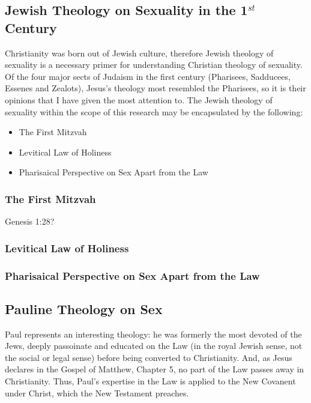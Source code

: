 \documentclass{article}
\begin{document}
\subsection{Jewish Theology on Sexuality in the 1$^{st}$ Century}
    Christianity was born out of Jewish culture, therefore Jewish theology
    of sexuality is a necessary primer for understanding Christian theology
    of sexuality. Of the four major sects of Judaism in the first century
    (Pharisees, Sadducees, Essenes and Zealots), Jesus's theology most
    resembled the Pharisees\cite{finkelstein_1929}, so it is their 
    opinions that I have given the most attention to.
    The Jewish theology of sexuality within the scope of this research
    may be encapsulated by the following:
    \begin{itemize}
        \item{The First Mitzvah}
        \item{Levitical Law of Holiness}
        \item{Pharisaical Perspective on Sex Apart from the Law}
    \end{itemize}

    \subsubsection{The First Mitzvah}
        Genesis 1:28?

    \subsubsection{Levitical Law of Holiness}
    \subsubsection{Pharisaical Perspective on Sex Apart from the Law}

\subsection{Pauline Theology on Sex}

    \par Paul represents an interesting theology: he was formerly the most
        devoted of the Jews, deeply passoinate and educated on the Law (in
        the royal Jewish sense, not the social or legal sense) before being
        converted to Christianity. 
        And, as Jesus declares in the Gospel of Matthew, Chapter 5, no part
        of the Law passes away in Christianity. Thus, Paul's expertise in the
        Law is applied to the New Covanent under Christ, which the New
        Testament preaches. \\
\end{document}
